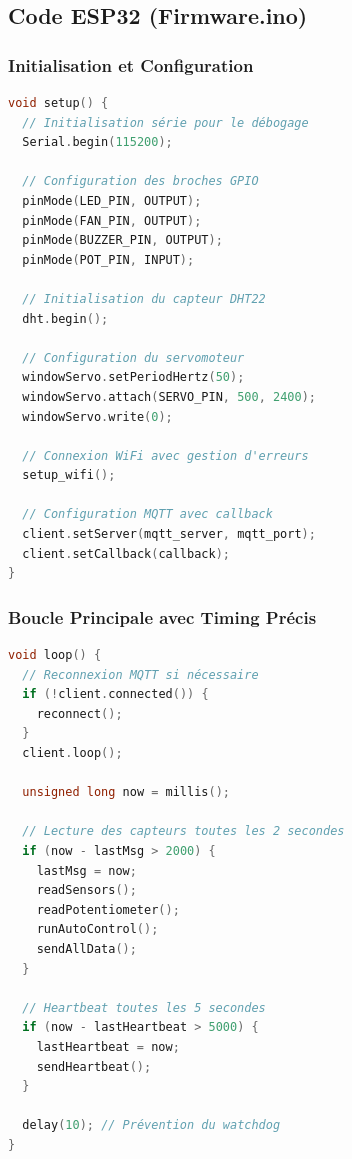 \documentclass[12pt,a4paper]{article}
\begin{document}
\subsection{Code ESP32 (Firmware.ino)}

\subsubsection{Initialisation et Configuration}
\begin{lstlisting}[language=c++, caption=Fonction setup() du firmware ESP32]
void setup() {
  // Initialisation série pour le débogage
  Serial.begin(115200);
  
  // Configuration des broches GPIO
  pinMode(LED_PIN, OUTPUT);
  pinMode(FAN_PIN, OUTPUT);
  pinMode(BUZZER_PIN, OUTPUT);
  pinMode(POT_PIN, INPUT);
  
  // Initialisation du capteur DHT22
  dht.begin();
  
  // Configuration du servomoteur
  windowServo.setPeriodHertz(50);
  windowServo.attach(SERVO_PIN, 500, 2400);
  windowServo.write(0);
  
  // Connexion WiFi avec gestion d'erreurs
  setup_wifi();
  
  // Configuration MQTT avec callback
  client.setServer(mqtt_server, mqtt_port);
  client.setCallback(callback);
}
\end{lstlisting}

\subsubsection{Boucle Principale avec Timing Précis}
\begin{lstlisting}[language=c++, caption=Fonction loop() avec gestion du timing]
void loop() {
  // Reconnexion MQTT si nécessaire
  if (!client.connected()) {
    reconnect();
  }
  client.loop();
  
  unsigned long now = millis();
  
  // Lecture des capteurs toutes les 2 secondes
  if (now - lastMsg > 2000) {
    lastMsg = now;
    readSensors();
    readPotentiometer();
    runAutoControl();
    sendAllData();
  }
  
  // Heartbeat toutes les 5 secondes
  if (now - lastHeartbeat > 5000) {
    lastHeartbeat = now;
    sendHeartbeat();
  }
  
  delay(10); // Prévention du watchdog
}
\end{lstlisting}
\end{document}
